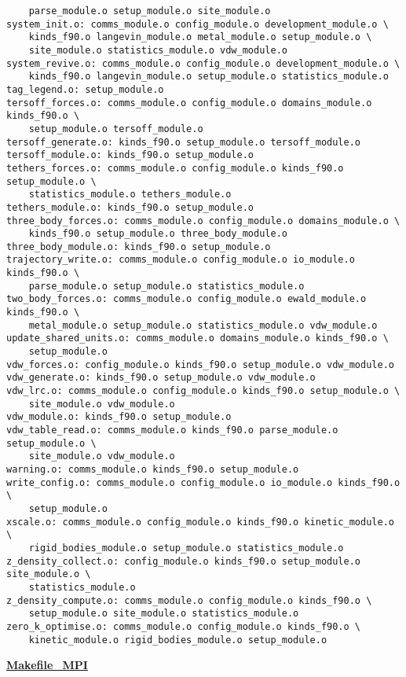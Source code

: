 \begin{verbatim}
	parse_module.o setup_module.o site_module.o
system_init.o: comms_module.o config_module.o development_module.o \
	kinds_f90.o langevin_module.o metal_module.o setup_module.o \
	site_module.o statistics_module.o vdw_module.o
system_revive.o: comms_module.o config_module.o development_module.o \
	kinds_f90.o langevin_module.o setup_module.o statistics_module.o
tag_legend.o: setup_module.o
tersoff_forces.o: comms_module.o config_module.o domains_module.o kinds_f90.o \
	setup_module.o tersoff_module.o
tersoff_generate.o: kinds_f90.o setup_module.o tersoff_module.o
tersoff_module.o: kinds_f90.o setup_module.o
tethers_forces.o: comms_module.o config_module.o kinds_f90.o setup_module.o \
	statistics_module.o tethers_module.o
tethers_module.o: kinds_f90.o setup_module.o
three_body_forces.o: comms_module.o config_module.o domains_module.o \
	kinds_f90.o setup_module.o three_body_module.o
three_body_module.o: kinds_f90.o setup_module.o
trajectory_write.o: comms_module.o config_module.o io_module.o kinds_f90.o \
	parse_module.o setup_module.o statistics_module.o
two_body_forces.o: comms_module.o config_module.o ewald_module.o kinds_f90.o \
	metal_module.o setup_module.o statistics_module.o vdw_module.o
update_shared_units.o: comms_module.o domains_module.o kinds_f90.o \
	setup_module.o
vdw_forces.o: config_module.o kinds_f90.o setup_module.o vdw_module.o
vdw_generate.o: kinds_f90.o setup_module.o vdw_module.o
vdw_lrc.o: comms_module.o config_module.o kinds_f90.o setup_module.o \
	site_module.o vdw_module.o
vdw_module.o: kinds_f90.o setup_module.o
vdw_table_read.o: comms_module.o kinds_f90.o parse_module.o setup_module.o \
	site_module.o vdw_module.o
warning.o: comms_module.o kinds_f90.o setup_module.o
write_config.o: comms_module.o config_module.o io_module.o kinds_f90.o \
	setup_module.o
xscale.o: comms_module.o config_module.o kinds_f90.o kinetic_module.o \
	rigid_bodies_module.o setup_module.o statistics_module.o
z_density_collect.o: config_module.o kinds_f90.o setup_module.o site_module.o \
	statistics_module.o
z_density_compute.o: comms_module.o config_module.o kinds_f90.o \
	setup_module.o site_module.o statistics_module.o
zero_k_optimise.o: comms_module.o config_module.o kinds_f90.o \
	kinetic_module.o rigid_bodies_module.o setup_module.o
\end{verbatim}
\clearpage
{\sc \bf \underline{Makefile\_MPI}}

